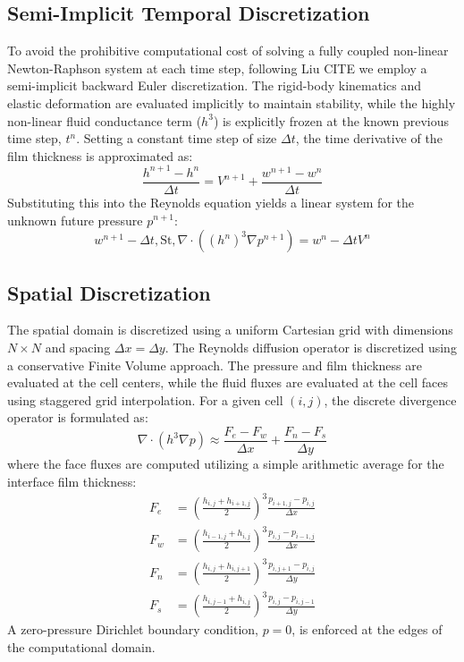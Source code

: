 \subsection{Semi-Implicit Temporal Discretization}

To avoid the prohibitive computational cost of solving a fully coupled non-linear Newton-Raphson system at each time step, following Liu CITE we employ a semi-implicit backward Euler discretization. 
The rigid-body kinematics and elastic deformation are evaluated implicitly to maintain stability, while the highly non-linear fluid conductance term ($h^3$) is explicitly frozen at the known previous time step, $t^n$.
Setting a constant time step of size $\Delta t$, the time derivative of the film thickness is approximated as:
\begin{equation}
    \frac{h^{n+1} - h^n}{\Delta t} = V^{n+1} + \frac{w^{n+1} - w^n}{\Delta t}
\end{equation}
Substituting this into the Reynolds equation yields a linear system for the unknown future pressure $p^{n+1}$:
\begin{equation}
w^{n+1} - \Delta t , \text{St} , \nabla \cdot \left( (h^n)^3 \nabla p^{n+1} \right) = w^n - \Delta t V^n
\end{equation}

\subsection{Spatial Discretization}

The spatial domain is discretized using a uniform Cartesian grid with dimensions $N \times N$ and spacing $\Delta x = \Delta y$.
The Reynolds diffusion operator is discretized using a conservative Finite Volume approach.
The pressure and film thickness are evaluated at the cell centers, while the fluid fluxes are evaluated at the cell faces using staggered grid interpolation.
For a given cell $(i, j)$, the discrete divergence operator is formulated as:
\begin{equation}
    \nabla \cdot \left( h^3 \nabla p \right) \approx \frac{F_e - F_w}{\Delta x} + \frac{F_n - F_s}{\Delta y}
\end{equation}
where the face fluxes are computed utilizing a simple arithmetic average for the interface film thickness:
\begin{align}
F_e &= \left( \frac{h_{i,j} + h_{i+1,j}}{2} \right)^3 \frac{p_{i+1,j} - p_{i,j}}{\Delta x} \\
F_w &= \left( \frac{h_{i-1,j} + h_{i,j}}{2} \right)^3 \frac{p_{i,j} - p_{i-1,j}}{\Delta x} \\
F_n &= \left( \frac{h_{i,j} + h_{i,j+1}}{2} \right)^3 \frac{p_{i,j+1} - p_{i,j}}{\Delta y} \\
F_s &= \left( \frac{h_{i,j-1} + h_{i,j}}{2} \right)^3 \frac{p_{i,j} - p_{i,j-1}}{\Delta y}
\end{align}
A zero-pressure Dirichlet boundary condition, $p=0$, is enforced at the edges of the computational domain.

